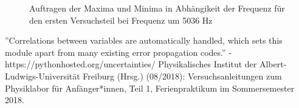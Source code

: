 \documentclass[11pt,a4paper]{article}
\begin{document}
\begin{figure}[p]
\centering
{}
\renewcommand\thefigure{3}
\caption[Auftragen der Maxima und Minima in Abh\"angikeit der Frequenz f\"ur den ersten Versuchsteil bei Frequenz um 5036 Hz]{Auftragen der Maxima und Minima in Abh\"angikeit der Frequenz f\"ur den ersten Versuchsteil bei Frequenz um 5036 Hz}
\label{Abb:4}
\end{figure}

\begin{thebibliography}{9}
''Correlations between variables are automatically handled, which sets this module apart from many existing error propagation codes.'' - https://pythonhosted.org/uncertainties/
 Physikalisches Institut der Albert-Ludwigs-Universität Freiburg (Hrsg.) (08/2018): Versuchsanleitungen zum Physiklabor für Anfänger*innen, Teil 1, Ferienpraktikum im Sommersemester 2018.
\end{thebibliography}
\end{document}
